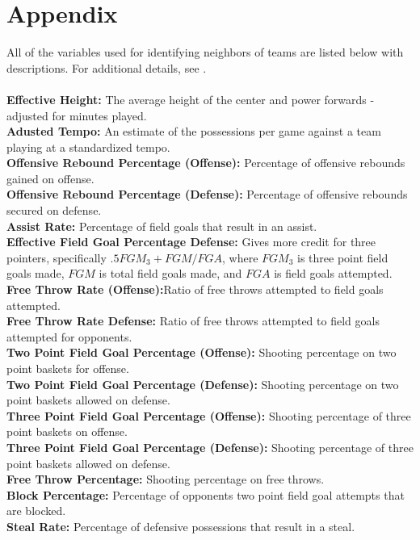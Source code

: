 \documentclass[letterpaper,12pt]{article}
\begin{document}
\section*{Appendix}
\footnotesize
All of the variables used for identifying neighbors of teams are listed below with descriptions. For additional details, see \cite{kenpom.com}.\\
\\
\textbf{Effective Height:} The average height of the center and power forwards - adjusted for minutes played.  \\
\textbf{Adusted Tempo:} An estimate of the possessions per game against a team playing at a standardized tempo. \\
\textbf{Offensive Rebound Percentage (Offense):} Percentage of offensive rebounds gained on offense.\\
\textbf{Offensive Rebound Percentage (Defense):} Percentage of offensive rebounds secured on defense.\\
\textbf{Assist Rate:} Percentage of field goals that result in an assist.\\
\textbf{Effective Field Goal Percentage Defense:} Gives more credit for three pointers, specifically $.5 FGM_3 + FGM /FGA$, where $FGM_3$ is three point field goals made, $FGM$ is total field goals made, and  $FGA$ is field goals attempted. \\
\textbf{Free Throw Rate (Offense):}Ratio of free throws attempted to field goals attempted. \\
\textbf{Free Throw Rate Defense:} Ratio of free throws attempted to field goals attempted for opponents. \\
\textbf{Two Point Field Goal Percentage (Offense):} Shooting percentage on two point baskets for offense. \\
\textbf{Two Point Field Goal Percentage (Defense):} Shooting percentage on two point baskets allowed on defense.\\
\textbf{Three Point Field Goal Percentage (Offense):} Shooting percentage of three point baskets on offense.\\
\textbf{Three Point Field Goal Percentage (Defense):} Shooting percentage of three point baskets allowed on defense.\\
\textbf{Free Throw Percentage:} Shooting percentage on free throws.\\
\textbf{Block Percentage:} Percentage of opponents two point field goal attempts that are blocked.\\
\textbf{Steal Rate:} Percentage of defensive possessions that result in a steal. \\
\end{document}
